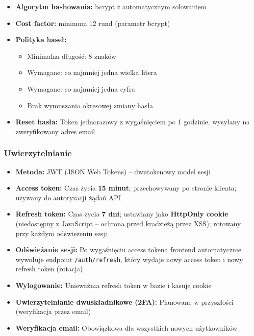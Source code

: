 \documentclass[12pt,a4paper]{article}
\begin{document}
\begin{itemize}[leftmargin=*]
    \item \textbf{Algorytm hashowania:} bcrypt z automatycznym solowaniem
    \item \textbf{Cost factor:} minimum 12 rund (parametr bcrypt)
    \item \textbf{Polityka haseł:}
    \begin{itemize}
        \item Minimalna długość: 8 znaków
        \item Wymagane: co najmniej jedna wielka litera
        \item Wymagane: co najmniej jedna cyfra
            
        \item Brak wymuszania okresowej zmiany hasła
    \end{itemize}
    \item \textbf{Reset hasła:} Token jednorazowy z wygaśnięciem po 1 godzinie, wysyłany na zweryfikowany adres email
\end{itemize}

\subsubsection{Uwierzytelnianie}

\begin{itemize}[leftmargin=*]
    \item \textbf{Metoda:} JWT (JSON Web Tokens) -- dwutokenowy model sesji
    \item \textbf{Access token:} Czas życia \textbf{15 minut}; przechowywany po stronie klienta; używany do autoryzacji żądań API
    \item \textbf{Refresh token:} Czas życia \textbf{7 dni}; ustawiany jako \textbf{HttpOnly cookie} (niedostępny z JavaScript -- ochrona przed kradzieżą przez XSS); rotowany przy każdym odświeżeniu sesji
    \item \textbf{Odświeżanie sesji:} Po wygaśnięciu access tokena frontend automatycznie wywołuje endpoint \texttt{/auth/refresh}, który wydaje nowy access token i nowy refresh token (rotacja)
    \item \textbf{Wylogowanie:} Unieważnia refresh token w bazie i kasuje cookie
    \item \textbf{Uwierzytelnianie dwuskładnikowe (2FA):} Planowane w przyszłości (weryfikacja przez email)
    \item \textbf{Weryfikacja email:} Obowiązkowa dla wszystkich nowych użytkowników
\end{itemize}
\end{document}
